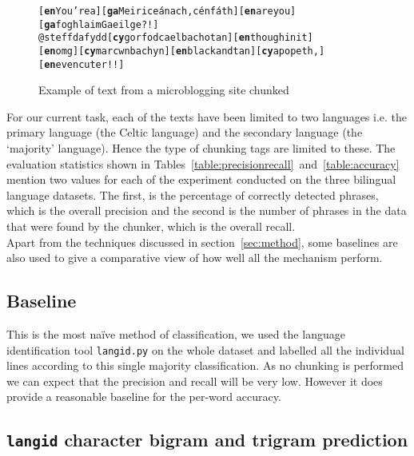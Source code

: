 \documentclass[11pt]{article}
\begin{document}
\begin{figure}
\begin{small}
\begin{alltt}
[\textbf{en} You're a] [\textbf{ga} Meirice\'{a}nach, c\'{e}n f\'{a}th] [\textbf{en} are you] [\textbf{ga} foghlaim Gaeilge?!] 
@steffdafydd [\textbf{cy} gorfod cael bach o tan] [\textbf{en} though init] 
[\textbf{en} omg] [\textbf{cy} mar cwn bach yn] [\textbf{en} black and tan] [\textbf{cy} a popeth,] [\textbf{en} even cuter!!] 
\end{alltt}
\end{small}
\caption{Example of text from a microblogging site chunked}
\label{fig:tweets}
\end{figure}

For our current task, each of the texts have been limited to two languages i.e. the primary language (the Celtic language) and the 
secondary language (the `majority' language). Hence the type of chunking tags are limited to these. The evaluation statistics shown 
in Tables~\ref{table:precisionrecall}~and~\ref{table:accuracy} mention two values for each of the experiment conducted on the three bilingual 
language datasets. The first, is the percentage of correctly detected phrases, which is the overall precision and the second is the 
number of phrases in the data that were found by the chunker, which is the overall recall. \\

Apart from the techniques discussed in section~\ref{sec:method}, some baselines are also used to give a comparative view of how well all the mechanism perform.

\subsection{Baseline}
\label{baseline}

This is the most na\"{i}ve method of classification, we used the language identification tool \texttt{langid.py} \cite{lui2012langid} on the whole dataset and labelled all the individual lines according to this single majority classification. As no chunking is performed we can expect that the precision and recall will be very low. However it does provide a reasonable baseline for the per-word accuracy.  \\

\subsection{\texttt{langid} character bigram and trigram prediction}
\label{langidstuff}
\end{document}
